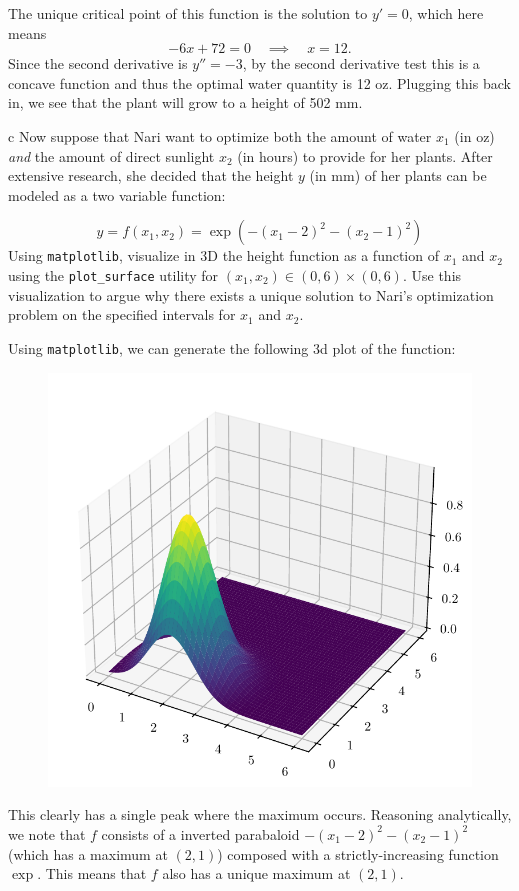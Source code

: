 \documentclass[expanded]{pset}
\begin{document}
\begin{parts}
  The unique critical point of this function is the solution to $y'=0$, which here means
  \[
    -6x+72 = 0 \quad\implies \quad x = 12.
  \]
  Since the second derivative is $y''=-3$, by the second derivative test this is a concave function and 
  thus the optimal water quantity is 12 oz. Plugging this back in, we see that the plant will grow to a height of 502 mm.

  \begin{part}{c}
    Now suppose that Nari want to optimize both the amount of water $x_1$ (in oz) \textit{and} the amount of direct sunlight $x_2$ (in hours) to provide for her plants. After extensive research, she decided that the height $y$ (in mm) of her plants can be modeled as a two variable function:

    $$y = f(x_1, x_2) = \exp\left(-(x_1 - 2)^2 - (x_2 - 1)^2 \right)$$
    Using \texttt{matplotlib}, visualize in 3D the height function as a function of $x_1$ and $x_2$ using the \texttt{plot\_surface} utility for $(x_1, x_2) \in (0, 6) \times (0, 6)$. 
    Use this visualization to argue why there exists a unique solution to Nari's optimization problem on the specified intervals for $x_1$ and $x_2$.
  \end{part}

  Using \texttt{matplotlib}, we can generate the following 3d plot of the function:

  \begin{figure}[ht]
    \centering
    \includegraphics[]{2b.pdf}
  \end{figure}\noindent

  This clearly has a single peak where the maximum occurs. Reasoning analytically, we note that $f$ consists of a inverted parabaloid $-(x_1-2)^2 - (x_2 - 1)^2$ (which has a maximum at $(2,1)$) composed with a strictly-increasing function $\exp$. This means that $f$ also has a unique maximum at $(2, 1)$.
\end{parts}
\end{document}
